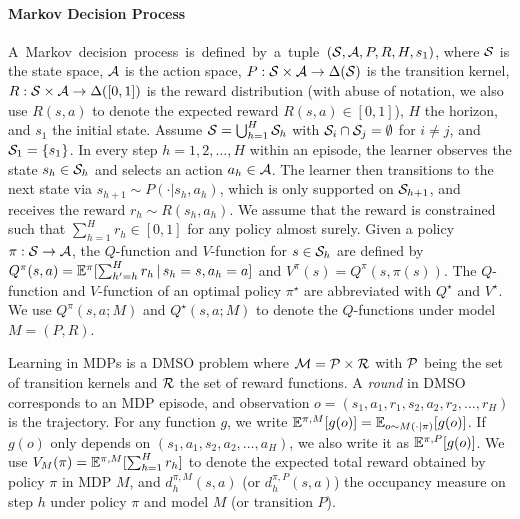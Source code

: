 \paragraph{Markov Decision Process} 
\mbox{A Markov decision process is defined by a tuple $(\mathcal{S}, \mathcal{A}, P, R, H, s_1)$,} where $\mathcal{S}$ is the state space, $\mathcal{A}$ is the action space, $P:\mathcal{S}\times\mathcal{A}\rightarrow\Delta(\mathcal{S})$ is the transition kernel, $R:\mathcal{S}\times\mathcal{A}\rightarrow\Delta([0,1])$ is the reward distribution (with abuse of notation, we also use $R(s,a)$ to denote the expected reward $R(s,a)\in [0,1]$), $H$ the horizon, and $s_1$ the initial state. Assume $\mathcal{S}=\bigcup_{h=1}^H \mathcal{S}_h$ with $\mathcal{S}_i \cap \mathcal{S}_j =\emptyset$ for $i\neq j$, and $\mathcal{S}_1=\{s_1\}$. 
In every step $h=1,2,\ldots, H$ within an episode, the learner observes the state $s_h\in\mathcal{S}_h$ and selects an action $a_h\in\mathcal{A}$. The learner then transitions to the next state via $s_{h+1}\sim P(\cdot|s_h,a_h)$, which is only supported on $\mathcal{S}_{h+1}$, and receives the reward $r_h\sim R(s_h,a_h)$. 
We assume that the reward is constrained such that $\sum_{h=1}^H r_h\in [0,1]$ for any policy almost surely. Given a policy $\pi:\mathcal{S}\to\mathcal{A}$, the $Q$-function and $V$-function for $s\in\mathcal{S}_h$ are defined by $Q^\pi(s, a)=\mathbb{E}^\pi[\sum_{h'=h}^{H}r_h\,|\,s_h=s,a_h=a]$ and  $V^\pi(s)=Q^\pi(s,\pi(s))$. The $Q$-function and $V$-function of an optimal policy $\pi^\star$ are abbreviated with 
$Q^\star$ and $V^\star$. We use $Q^\pi(s,a;M)$ and $Q^\star(s,a;M)$ to denote the $Q$-functions under model $M=(P,R)$. %

Learning in MDPs is a DMSO problem where $\mathcal{M}=\mathcal{P}\times \mathcal{R}$ with $\mathcal{P}$ being the set of transition kernels and $\mathcal{R}$ the set of reward functions. A \emph{round} in DMSO corresponds to an MDP episode, and observation $o = (s_1, a_1, r_1, s_2, a_2, r_2, \ldots, r_H)$ is the trajectory.  For any function $g$, we write $\mathbb{E}^{\pi, M}[g(o)] = \mathbb{E}_{o\sim M(\cdot|\pi)}[g(o)]$. If $g(o)$ only depends on $(s_1,a_1,s_2,a_2, \ldots, a_H)$, we also write it as  $\mathbb{E}^{\pi, P}[g(o)]$.  We use $V_M(\pi) = \mathbb{E}^{\pi, M}[\sum_{h=1}^H r_h]$ to denote the expected total reward obtained by policy $\pi$ in MDP $M$, and $d_h^{\pi, M}(s,a)$ (or $d_h^{\pi, P}(s,a)$) the occupancy measure on step $h$ under policy $\pi$ and model $M$ (or transition $P$). 

